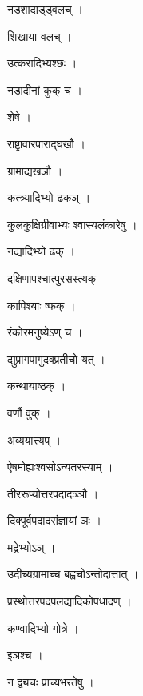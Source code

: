 \documentclass[10pt, openany]{book}
\begin{document}
\noindent नडशादाड्ड्वलच् ।

\noindent शिखाया वलच् ।

\noindent उत्करादिभ्यश्छः ।

\noindent नडादीनां कुक् च ।

\noindent शेषे ।

\noindent राष्ट्रावारपाराद्घखौ ।

\noindent ग्रामाद्यखञौ ।

\noindent कत्त्र्यादिभ्यो ढकञ् ।

\noindent कुलकुक्षिग्रीवाभ्यः श्वास्यलंकारेषु ।

\noindent नद्यादिभ्यो ढक् ।

\noindent दक्षिणापश्चात्पुरसस्त्यक् ।

\noindent कापिश्याः ष्फक् ।

\noindent रंकोरमनुष्येऽण् च ।

\noindent द्युप्रागपागुदक्प्रतीचो यत् ।

\noindent कन्थायाष्ठक् ।

\noindent वर्णौ वुक् ।

\noindent अव्ययात्त्यप् ।

\noindent ऐषमोह्यःश्वसोऽन्यतरस्याम् ।

\noindent तीररूप्योत्तरपदादञ्ञौ ।

\noindent दिक्पूर्वपदादसंज्ञायां ञः ।

\noindent मद्रेभ्योऽञ् ।

\noindent उदीच्यग्रामाच्च बह्वचोऽन्तोदात्तात् ।

\noindent प्रस्थोत्तरपदपलद्यादिकोपधादण् ।

\noindent कण्वादिभ्यो गोत्रे ।

\noindent इञश्च ।

\noindent न द्व्यचः प्राच्यभरतेषु ।
\end{document}
